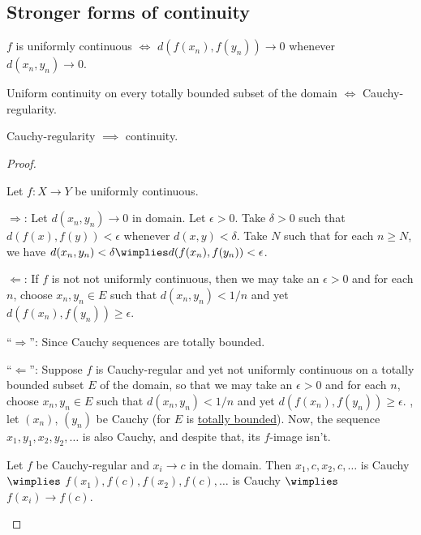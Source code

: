 \subsection{Stronger forms of continuity}
	

	\begin{prp}
		\leavevmode
		\begin{mylist}
			\item $f$ is uniformly continuous $\iff$ $d(f(x_n), f(y_n))\to 0$ whenever $d(x_n, y_n)\to 0$.
			
			\item Uniform continuity on every totally bounded subset of the domain $\iff$ Cauchy-regularity.
			
			\item Cauchy-regularity $\implies$ continuity.
		\end{mylist}
	\end{prp}
	
	\begin{proof}
		\begin{mylist}
			\item Let $f\colon X\to Y$ be uniformly continuous.
			
			$\Rightarrow$: Let $d(x_n, y_n)\to 0$ in domain. Let $\epsilon > 0$. Take $\delta> 0$ such that $d(f(x), f(y)) < \epsilon$ whenever $d(x, y) < \delta$. Take $N$ such that for each $n\ge N$, we have $d(x_n, y_n) < \delta\wimplies d(f(x_n), f(y_n)) < \epsilon$.
			
			$\Leftarrow$: If $f$ is not not uniformly continuous, then we may take an $\epsilon > 0$ and for each $n$, choose
			$x_n, y_n\in E$ such that $d(x_n, y_n) < 1/n$ and yet $d(f(x_n), f(y_n)) \ge \epsilon$.
			
			
			\item ``$\Rightarrow$'': Since Cauchy sequences are totally bounded.
			
			``$\Leftarrow$'': Suppose $f$ is Cauchy-regular and yet not uniformly continuous on a totally bounded subset $E$ of the domain, so that we may take an $\epsilon > 0$ and for each $n$, choose
			$x_n, y_n\in E$ such that $d(x_n, y_n) < 1/n$ and yet $d(f(x_n), f(y_n)) \ge \epsilon$. \Wlogg, let $(x_n)$, $(y_n)$ be Cauchy (for $E$ is \uline{totally bounded}). Now, the sequence $x_1, y_1, x_2, y_2, \ldots$ is also Cauchy, and despite that, its $f$-image isn't.
			
			
			\item Let $f$ be Cauchy-regular and $x_i\to c$ in the domain. Then $x_1, c, x_2, c, \ldots$ is Cauchy $\wimplies$ $f(x_1), f(c), f(x_2), f(c), \ldots$ is Cauchy $\wimplies$ $f(x_i)\to f(c)$.\qedhere
		\end{mylist}
	\end{proof}
	
